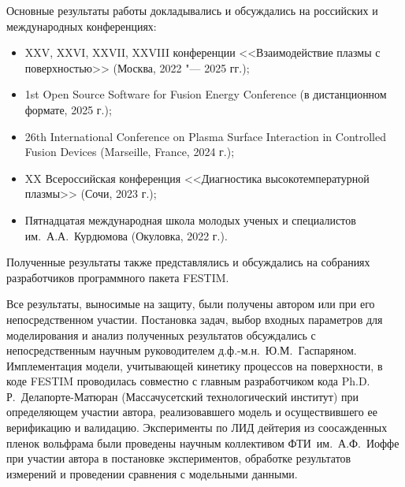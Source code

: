 {\probation}
Основные результаты работы докладывались и обсуждались на российских и международных конференциях:
\begin{itemize}
    \item XXV, XXVI, XXVII, XXVIII конференции <<Взаимодействие плазмы с поверхностью>> (Москва, 2022 "--- 2025 гг.);
    \item 1st Open Source Software for Fusion Energy Conference (в дистанционном формате, 2025 г.);
    \item 26th International Conference on Plasma Surface Interaction in Controlled Fusion Devices (Marseille, France, 2024 г.);
    \item XX Всероссийская конференция <<Диагностика высокотемпературной плазмы>> (Сочи, 2023 г.);
    \item Пятнадцатая международная школа молодых ученых и специалистов им.~А.А.~Курдюмова (Окуловка, 2022 г.).
\end{itemize}
Полученные результаты также представлялись и обсуждались на собраниях разработчиков программного пакета FESTIM.

    {\contribution} Все результаты, выносимые на защиту, были получены автором или при его непосредственном участии. Постановка задач, выбор входных параметров для моделирования и анализ полученных результатов обсуждались с непосредственным научным руководителем д.ф.-м.н.~Ю.М.~Гаспаряном. Имплементация модели, учитывающей кинетику процессов на поверхности, в коде FESTIM проводилась совместно с главным разработчиком кода Ph.D. Р.~Делапорте-Матюран (Массачусетский технологический институт) при определяющем участии автора, реализовавшего модель и осуществившего ее верификацию и валидацию. Эксперименты по ЛИД дейтерия из соосажденных пленок вольфрама были проведены научным коллективом ФТИ~им.~А.Ф.~Иоффе при участии автора в постановке экспериментов, обработке результатов измерений и проведении сравнения с модельными данными.

